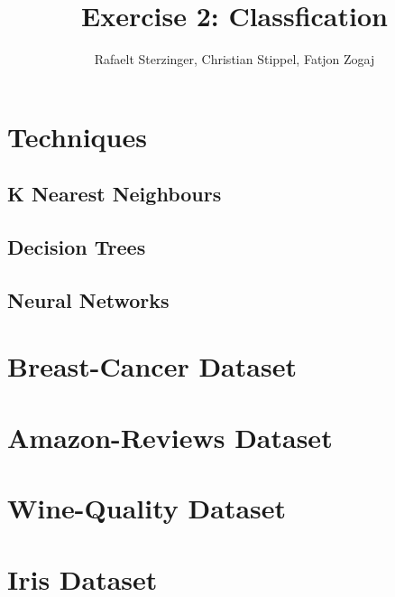 \documentclass{article}
\title{Exercise 2: Classfication}
\author{Rafaelt Sterzinger, Christian Stippel, Fatjon Zogaj}
\begin{document}
\maketitle

\section{Techniques}

\subsection{K Nearest Neighbours}

\subsection{Decision Trees}

\subsection{Neural Networks}

\section{Breast-Cancer Dataset}


\section{Amazon-Reviews Dataset}


\section{Wine-Quality Dataset}


\section{Iris Dataset}

\end{document}
